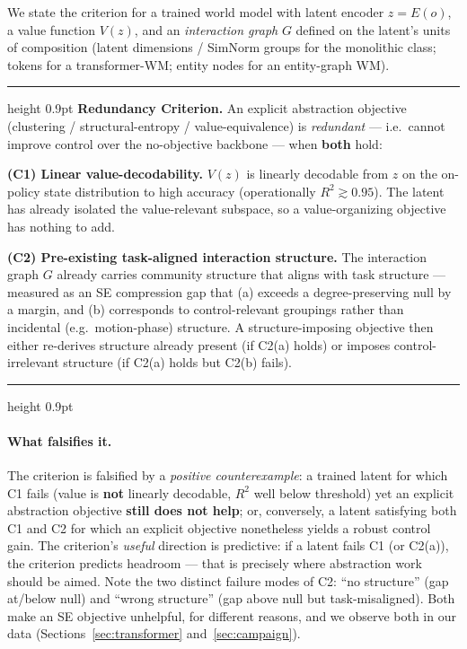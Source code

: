 \documentclass{article}
\newenvironment{criterionbox}
  {\par\bigskip\noindent\begin{center}\setlength{\fboxsep}{10pt}%
   \begin{minipage}{0.95\linewidth}\hrule height 0.9pt\vspace{8pt}\noindent\ignorespaces}
  {\par\vspace{8pt}\hrule height 0.9pt\end{minipage}\end{center}\bigskip}
\begin{document}
We state the criterion for a trained world model with latent encoder $z = E(o)$, a value function $V(z)$, and an \emph{interaction graph} $G$ defined on the latent's units of composition (latent dimensions / SimNorm groups for the monolithic class; tokens for a transformer-WM; entity nodes for an entity-graph WM).

\begin{criterionbox}
\textbf{Redundancy Criterion.} An explicit abstraction objective (clustering / structural-entropy / value-equivalence) is \emph{redundant} --- i.e.\ cannot improve control over the no-objective backbone --- when \textbf{both} hold:

\medskip
\noindent\textbf{(C1) Linear value-decodability.} $V(z)$ is linearly decodable from $z$ on the on-policy state distribution to high accuracy (operationally $R^2 \gtrsim 0.95$). The latent has already isolated the value-relevant subspace, so a value-organizing objective has nothing to add.

\medskip
\noindent\textbf{(C2) Pre-existing task-aligned interaction structure.} The interaction graph $G$ already carries community structure that aligns with task structure --- measured as an SE compression gap that (a) exceeds a degree-preserving null by a margin, and (b) corresponds to control-relevant groupings rather than incidental (e.g.\ motion-phase) structure. A structure-imposing objective then either re-derives structure already present (if C2(a) holds) or imposes control-irrelevant structure (if C2(a) holds but C2(b) fails).
\end{criterionbox}

\paragraph{What falsifies it.} The criterion is falsified by a \emph{positive counterexample}: a trained latent for which C1 fails (value is \textbf{not} linearly decodable, $R^2$ well below threshold) yet an explicit abstraction objective \textbf{still does not help}; or, conversely, a latent satisfying both C1 and C2 for which an explicit objective nonetheless yields a robust control gain. The criterion's \emph{useful} direction is predictive: if a latent fails C1 (or C2(a)), the criterion predicts headroom --- that is precisely where abstraction work should be aimed. Note the two distinct failure modes of C2: ``no structure'' (gap at/below null) and ``wrong structure'' (gap above null but task-misaligned). Both make an SE objective unhelpful, for different reasons, and we observe both in our data (Sections~\ref{sec:transformer} and~\ref{sec:campaign}).
\end{document}
